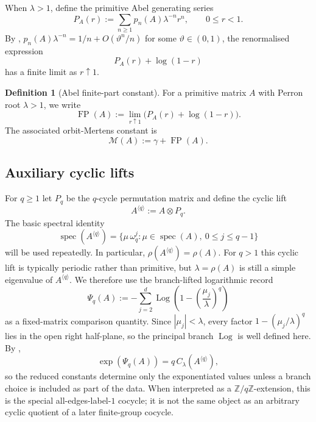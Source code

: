 \documentclass[11pt,a4paper]{amsart}
\theoremstyle{plain}
\theoremstyle{definition}
\newtheorem{definition}[theorem]{Definition}
\theoremstyle{remark}
\DeclareMathOperator{\spec}{spec}
\DeclareMathOperator{\FP}{FP}
\DeclareMathOperator{\Log}{Log}
\newcommand{\ZZ}{\mathbb{Z}}
\begin{document}
When \(\lambda>1\), define the primitive Abel generating series
\[
  P_A(r):=\sum_{n\ge 1}p_n(A)\lambda^{-n}r^n,
  \qquad 0\le r<1.
\]
By ,
\(p_n(A)\lambda^{-n}=1/n+O(\vartheta^n/n)\) for some
\(\vartheta\in(0,1)\), the renormalised expression
\[
  P_A(r)+\log(1-r)
\]
has a finite limit as \(r\uparrow 1\).

\begin{definition}[Abel finite-part constant]\label{def:abel-finite-part}
For a primitive matrix \(A\) with Perron root \(\lambda>1\), we write
\[
  \FP(A):=\lim_{r\uparrow 1}\bigl(P_A(r)+\log(1-r)\bigr).
\]
The associated orbit-Mertens constant is
\[
  \mathcal M(A):=\gamma+\FP(A).
\]
\end{definition}

\subsection{Auxiliary cyclic lifts}

For \(q\ge 1\) let \(P_q\) be the \(q\)-cycle permutation matrix and
define the cyclic lift
\begin{equation}\label{eq:cyclic-lift-def}
  A^{\langle q\rangle}:=A\otimes P_q.
\end{equation}
The basic spectral identity
\[
  \spec(A^{\langle q\rangle})
  =\{\mu\,\omega_q^j:\mu\in\spec(A),\ 0\le j\le q-1\}
\]
will be used repeatedly. In particular,
\(\rho(A^{\langle q\rangle})=\rho(A)\). For \(q>1\) this cyclic lift is
typically periodic rather than primitive, but \(\lambda=\rho(A)\) is
still a simple eigenvalue of \(A^{\langle q\rangle}\). We therefore use
the branch-lifted logarithmic record
\[
  \Psi_q(A):=
  -\sum_{j=2}^d
    \Log\!\left(1-\left(\frac{\mu_j}{\lambda}\right)^q\right)
\]
as a fixed-matrix comparison quantity. Since \(|\mu_j|<\lambda\), every
factor \(1-(\mu_j/\lambda)^q\) lies in the open right half-plane, so the
principal branch \(\Log\) is well defined here. By
,
\[
  \exp(\Psi_q(A))=q\,C_\lambda(A^{\langle q\rangle}),
\]
so the reduced constants determine only the exponentiated values unless
a branch choice is included as part of the data.
When interpreted as a \(\ZZ/q\ZZ\)-extension, this is the special
all-edges-label-\(1\) cocycle; it is not the same object as an arbitrary
cyclic quotient of a later finite-group cocycle.
\end{document}
